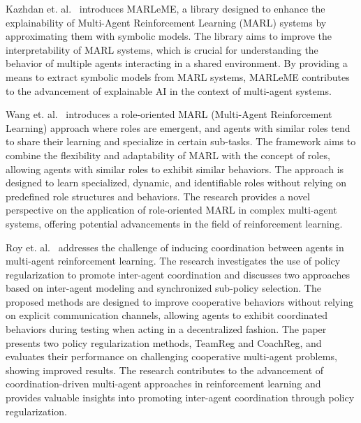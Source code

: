 \documentclass[runningheads]{llncs}
\begin{document}
Kazhdan et. al.~\cite{Kazhdan2020} introduces MARLeME, a library designed to enhance the explainability of Multi-Agent Reinforcement Learning (MARL) systems by approximating them with symbolic models. The library aims to improve the interpretability of MARL systems, which is crucial for understanding the behavior of multiple agents interacting in a shared environment. By providing a means to extract symbolic models from MARL systems, MARLeME contributes to the advancement of explainable AI in the context of multi-agent systems.

Wang et. al.~\cite{Wang2020} introduces a role-oriented MARL (Multi-Agent Reinforcement Learning) approach where roles are emergent, and agents with similar roles tend to share their learning and specialize in certain sub-tasks. The framework aims to combine the flexibility and adaptability of MARL with the concept of roles, allowing agents with similar roles to exhibit similar behaviors. The approach is designed to learn specialized, dynamic, and identifiable roles without relying on predefined role structures and behaviors. The research provides a novel perspective on the application of role-oriented MARL in complex multi-agent systems, offering potential advancements in the field of reinforcement learning.

Roy et. al.~\cite{Roy2020} addresses the challenge of inducing coordination between agents in multi-agent reinforcement learning. The research investigates the use of policy regularization to promote inter-agent coordination and discusses two approaches based on inter-agent modeling and synchronized sub-policy selection. The proposed methods are designed to improve cooperative behaviors without relying on explicit communication channels, allowing agents to exhibit coordinated behaviors during testing when acting in a decentralized fashion. The paper presents two policy regularization methods, TeamReg and CoachReg, and evaluates their performance on challenging cooperative multi-agent problems, showing improved results. The research contributes to the advancement of coordination-driven multi-agent approaches in reinforcement learning and provides valuable insights into promoting inter-agent coordination through policy regularization.
\end{document}
